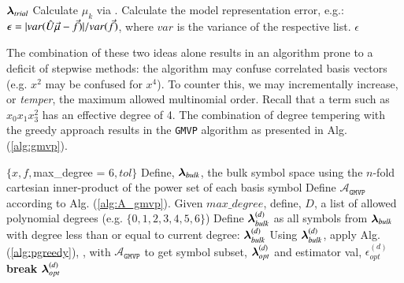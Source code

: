 \documentclass[twocolumn,aps,prd,floatfix,preprintnumbers,a4paper,nofootinbib,
superscriptaddress,10pt]{revtex4-1}
\def\gmvp#1{greedy-multivariate-polynomial#1
  (\texttt{GMVP}#1)\gdef\gmvp{\texttt{GMVP}}}
\begin{document}
{\scriptsize
\begin{algorithm}[H]
  \caption{$\mathcal{A}_{\gmvp}$, the action for \gmvp. Model calculation given basis symbols, and output of model error estimate.}
  \label{alg:A_gmvp}
  \begin{algorithmic}[1]
     ${\bm{\lambda}}_{trial}$
    \vskip 10pt
    \State Calculate $\mu_k$ via .
    \State Calculate the model representation error, e.g.: $\epsilon = |var(\hat{U} \vec{\mu} - \vec{f})|/var(\vec{f})$, where $var$ is the variance of the respective list.
    \vskip 10pt
     $\epsilon$
  \end{algorithmic}
\end{algorithm}
}
%
\par The combination of these two ideas alone results in an algorithm prone to a deficit of stepwise methods: the algorithm may confuse correlated basis vectors (e.g. $x^2$ may be confused for $x^4$).
%
To counter this, we may incrementally increase, or \textit{temper}, the maximum allowed multinomial order.
%
Recall that a term such as $x_0x_1x_3^2$ has an effective degree of 4.
%
The combination of degree tempering with the greedy approach results in the \gmvp{} algorithm as presented in Alg. (\ref{alg:gmvp}).
%
\hspace{1cm}
{\scriptsize
\begin{algorithm}[H]
  \caption{\gmvp{}, a degree tempered stepwise algorithm for multivariate polynomial modeling of scalar data.}
  \label{alg:gmvp}
  \begin{algorithmic}[1]
     $ \{ x, f, $max\_degree = 6$, tol \}$
    \vskip 10pt
    \State Define, ${\bm{\lambda}}_{bulk}$, the bulk symbol space using the $n$-fold cartesian inner-product of the power set of each basis symbol
    \State Define $\mathcal{A}_{\gmvp{}}$ according to Alg. (\ref{alg:A_gmvp}).
    \State Given $max\_degree$, define, ${ D}$, a list of allowed polynomial degrees (e.g. $\{0,1,2,3,4,5,6\}$)
      \State Define ${\bm{\lambda}}_{bulk}^{(d)}$ as all symbols from ${\bm{\lambda}}_{bulk}$ with degree less than or equal to current degree: ${\bm{\lambda}}^{(d)}_{bulk}$
      \State Using ${\bm{\lambda}}_{bulk}^{(d)}$, apply Alg. (\ref{alg:pgreedy}), \pgreedy{}, with $\mathcal{A}_{\gmvp{}}$ to get symbol subset, ${\bm{\lambda}}^{(d)}_{opt}$ and estimator val, $\epsilon^{(d)}_{opt}$
        \State \textbf{break}
      \EndIf
    \EndFor
    \vskip 10pt
     ${\bm{\lambda}}^{(d)}_{opt}$
  \end{algorithmic}
\end{algorithm}
}
%
%
\end{document}
